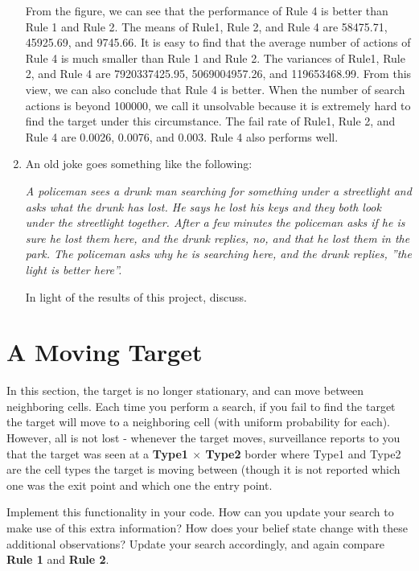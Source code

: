 \documentclass[letter]{article}
\begin{document}
\begin{enumerate}
	From the figure, we can see that the performance of Rule 4 is better than Rule 1 and
	Rule 2. The means of Rule1, Rule 2, and Rule 4 are 58475.71, 45925.69, and 9745.66. It
	is easy to find that the average number of actions of Rule 4 is much smaller than Rule 1
	and Rule 2. The variances of Rule1, Rule 2, and Rule 4 are 7920337425.95,
	5069004957.26, and 119653468.99. From this view, we can also conclude that Rule 4 is
	better. When the number of search actions is beyond 100000, we call it unsolvable
	because it is extremely hard to find the target under this circumstance. The fail rate of
	Rule1, Rule 2, and Rule 4 are 0.0026, 0.0076, and 0.003. Rule 4 also performs well.
	
	
	\item {An old joke goes something like the following: 
		\begin{center}
			\textit{A policeman sees a drunk man searching for something under a streetlight and asks what the drunk has lost.
				He says he lost his keys and they both look under the streetlight together. After a few minutes the policeman
				asks if he is sure he lost them here, and the drunk replies, no, and that he lost them in the park. The
				policeman asks why he is searching here, and the drunk replies, ”the light is better here”.}
		\end{center}
		\par{In light of the results of this project, discuss.}
		}
\end{enumerate}

\section{A Moving Target}
\label{sec:A Moving Target}
\par{In this section, the target is no longer stationary, and can move between neighboring cells. Each time you perform
	a search, if you fail to find the target the target will move to a neighboring cell (with uniform probability for each).
	However, all is not lost - whenever the target moves, surveillance reports to you that the target was seen at a \textbf{Type1
	$ \times $ Type2} border where Type1 and Type2 are the cell types the target is moving between (though it is not reported
	which one was the exit point and which one the entry point. }
	
\par{Implement this functionality in your code. How can you update your search to make use of this extra information?
	How does your belief state change with these additional observations? Update your search accordingly, and again
	compare \textbf{Rule 1} and \textbf{Rule 2}.}
\end{document}
